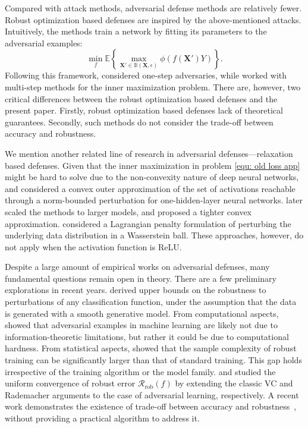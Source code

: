 \documentclass[11pt]{article}
\newcommand{\adv}{\mathrm{rob}}
\newcommand{\X}{\bm{X}}
\newcommand{\0}{\mathbf{0}}
\newcommand{\1}{\mathbf{1}}
\newcommand{\cR}{\mathcal{R}}
\newcommand{\bbB}{\mathbb{B}}
\newcommand{\bbE}{\mathbb{E}}
\begin{document}
\medskip
{} Compared with attack methods, adversarial defense methods are relatively fewer. Robust optimization based defenses are inspired by the above-mentioned attacks. Intuitively, the methods train a network by fitting its parameters to the adversarial examples:
\begin{equation}
\label{equ: old loss app}
\min_{f} \bbE \left\{ \max_{\X'\in\bbB(\X,\epsilon)}\phi(f(\X')Y)\right\}.
\end{equation}
Following this framework, \cite{huang2015learning,shaham2015understanding}  considered one-step adversaries, while \cite{madry2018towards} worked with multi-step methods for the inner maximization problem.
There are, however, two critical differences between the robust optimization based defenses
and the present paper. Firstly, robust optimization based defenses lack of theoretical guarantees. Secondly, such methods do not consider the trade-off between accuracy and robustness.

\medskip
{} We mention another related line of research in adversarial defenses---relaxation based defenses. Given that the inner maximization in problem \eqref{equ: old loss app} might be hard to solve due to the non-convexity nature of deep neural networks, \cite{kolter2017provable} and \cite{raghunathan2018certified} considered a convex outer approximation of the set of activations reachable through a norm-bounded perturbation for one-hidden-layer neural networks. \cite{wong1805scaling} later scaled the methods to larger models, and \cite{raghunathan2018semidefinite} proposed a tighter convex approximation. \cite{sinha2017certifiable,NIPS2018_7779} considered a Lagrangian penalty formulation of perturbing the underlying data distribution in a Wasserstein ball. These approaches, however, do not apply when the activation function is ReLU.

\medskip
{} Despite a large amount of empirical works on adversarial defenses, many fundamental questions remain open in theory. There are a few preliminary explorations in recent years. \cite{fawzi2018adversarial} derived upper bounds on the robustness to perturbations of any classification function, under the assumption that the data is
generated with a smooth generative model. From computational aspects, \cite{bubeck2018adversarial1,bubeck2018adversarial2} showed that adversarial examples in machine learning are likely not due to information-theoretic limitations, but rather it could be due to computational hardness. From statistical aspects, \cite{schmidt2018adversarially} showed that the sample complexity of robust training can be significantly larger than that of standard training. This gap holds irrespective of the training algorithm or the model family. \cite{NIPS2018_7307} and \cite{yin2018rademacher} studied the uniform convergence of robust error $\cR_\adv(f)$ by extending the classic VC and Rademacher arguments to the case of adversarial learning, respectively. A recent work demonstrates the existence of trade-off between accuracy and robustness~\cite{tsipras2018robustness}, without providing a practical algorithm to address it.
\end{document}
